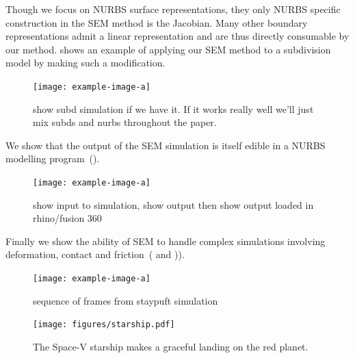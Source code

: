 Though we focus on NURBS surface representations, they only NURBS specific construction in the SEM method is the Jacobian.
Many other boundary representations admit a linear representation and are thus directly consumable by our method.
 shows an example of applying our SEM method to a subdivision model by making such a modification.
\begin{figure}[h]
  \texttt{[image: example-image-a]}
  \caption{show subd simulation if we have it. If it works really well we'll just mix subds and nurbs throughout the paper. }
  \label{fig:subd}
\end{figure}

We show that the output of the SEM simulation is itself edible in a NURBS modelling program~().
\begin{figure}[h]
  \texttt{[image: example-image-a]}
  \caption{show input to simulation, show output then show output loaded in rhino/fusion 360 }
  \label{fig:edit}
\end{figure}

Finally we show the ability of SEM to handle complex simulations involving deformation, contact and friction~( and )).
\begin{figure}[htp]
  \texttt{[image: example-image-a]}
  \caption{sequence of frames from staypuft simulation}
  \label{fig:staypuft}
\end{figure}

\begin{figure}[htp]
  \texttt{[image: figures/starship.pdf]}
  \caption{The Space-V starship makes a graceful landing on the red planet. }
  \label{fig:f1}
\end{figure}

